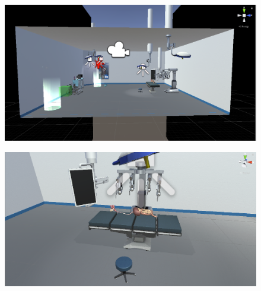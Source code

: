\begin{figure}[H]
	\begin{center}
 		\includegraphics[width = .5\textwidth]{source/images/image53.png}
	\end{center} 
\end{figure}

\begin{figure}[H]
	\begin{center}
 		\includegraphics[width = .5\textwidth]{source/images/image16.png}
	\end{center} 
\end{figure}